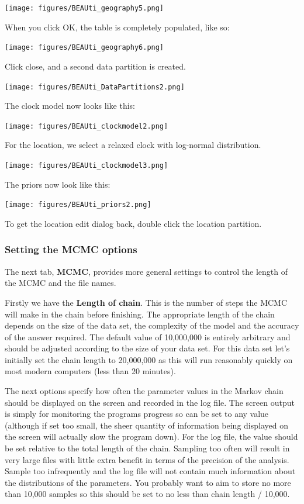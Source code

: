 \documentclass{article}
\begin{document}
\texttt{[image: figures/BEAUti\_geography5.png]}

When you click OK, the table is completely populated, like so:

\texttt{[image: figures/BEAUti\_geography6.png]}

Click close, and a second data partition is created.

\texttt{[image: figures/BEAUti\_DataPartitions2.png]}

The clock model now looks like this:

\texttt{[image: figures/BEAUti\_clockmodel2.png]}

For the location, we select a relaxed clock with log-normal distribution.

\texttt{[image: figures/BEAUti\_clockmodel3.png]}

The priors now look like this:

\texttt{[image: figures/BEAUti\_priors2.png]}

To get the location edit dialog back, double click the location partition.


\subsubsection*{Setting the MCMC options }

The next tab, {\bf MCMC}, provides more general
settings to control the length of the MCMC and the file names. 

Firstly we have the \textbf{Length of chain}. This is the number of
steps the MCMC will make in the chain before finishing. The appropriate length of the chain depends on the size of the data set, the complexity of the
model and the accuracy of the answer required. The default value of 10,000,000
is entirely arbitrary and should be adjusted according to the size
of your data set. For this data set let's initially set the chain
length to 20,000,000 as this will run reasonably quickly on most modern
computers (less than 20 minutes).

The next options specify how often the parameter values in the Markov
chain should be displayed on the screen and recorded in the log file.
The screen output is simply for monitoring the programs progress so
can be set to any value (although if set too small, the sheer quantity
of information being displayed on the screen will actually slow the
program down). For the log file, the value should be set relative
to the total length of the chain. Sampling too often will result in
very large files with little extra benefit in terms of the precision
of the analysis. Sample too infrequently and the log file will not
contain much information about the distributions of the parameters. 
You probably want to aim to store no more than 10,000 samples so this should be
set to no less than chain length / 10,000.
\end{document}
